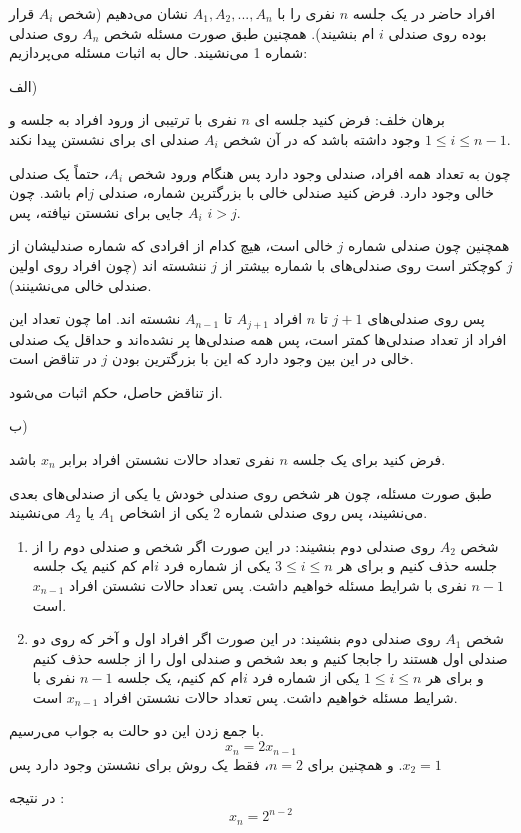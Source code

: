 \p
    افراد حاضر در یک جلسه $n$ نفری را با $A_1, A_2, ... , A_n$ نشان می‌دهیم (شخص $A_i$ قرار بوده روی صندلی $i$ ام بنشیند). همچنین طبق صورت مسئله شخص $A_n$ روی صندلی شماره 1 می‌نشیند. حال به اثبات مسئله می‌پردازیم:
    
    الف) 
    
    برهان خلف: فرض کنید جلسه ای $n$ نفری با ترتیبی از ورود افراد به جلسه و  $1\leq i \leq n-1$ وجود داشته باشد که در آن شخص $A_i$ صندلی ای برای نشستن پیدا نکند. 
    
    چون به تعداد همه افراد، صندلی وجود دارد پس هنگام ورود شخص $A_i$، حتماً یک صندلی خالی وجود دارد. فرض کنید صندلی خالی با بزرگترین شماره، صندلی $j$ام باشد. چون $A_i$ جایی برای نشستن نیافته، پس $i > j$. 
    
    همچنین چون صندلی شماره $j$ خالی است، هیچ کدام از افرادی که شماره صندلیشان از $j$ کوچکتر است روی صندلی‌های با شماره بیشتر از $j$ ننشسته اند (چون افراد روی اولین صندلی خالی می‌نشینند). 
    
    پس روی صندلی‌های $j+1$ تا $n$ افراد $A_{j+1}$ تا $A_{n-1}$ نشسته اند. اما چون تعداد این افراد از تعداد صندلی‌ها کمتر است، پس همه صندلی‌ها پر نشده‌اند و حداقل یک صندلی خالی در این بین وجود دارد که این با بزرگترین بودن $j$ در تناقض است. 
    
    از تناقض حاصل، حکم اثبات می‌شود.
    
    ب)
    
    فرض کنید برای یک جلسه $n$ نفری تعداد حالات نشستن افراد برابر $x_n$ باشد. 
    
    طبق صورت مسئله، چون هر شخص روی صندلی خودش یا یکی از صندلی‌های بعدی می‌نشیند، پس روی صندلی شماره 2 یکی از اشخاص $A_1$ یا $A_2$ می‌نشیند.  
    
    \begin{enumerate}
        \item
        شخص $A_2$ روی صندلی دوم بنشیند: در این صورت اگر شخص و صندلی دوم را از جلسه حذف کنیم و برای هر $3 \leq i \leq n$ یکی از شماره فرد $i$ام کم کنیم یک جلسه $n-1$ نفری با شرایط مسئله خواهیم داشت. پس تعداد حالات نشستن افراد $x_{n-1}$ است.
        \item
        شخص $A_1$ روی صندلی دوم بنشیند: در این صورت اگر افراد اول و آخر که روی دو صندلی اول هستند را جابجا کنیم و بعد شخص و صندلی اول را از جلسه حذف کنیم و برای هر $1 \leq i \leq n$ یکی از شماره فرد $i$ام کم کنیم، یک جلسه $n-1$ نفری با شرایط مسئله خواهیم داشت. پس تعداد حالات نشستن افراد $x_{n-1}$ است.
    \end{enumerate}
    با جمع زدن این دو حالت به جواب می‌رسیم.
    $$x_n = 2x_{n-1}$$
    و همچنین برای $n=2$، فقط یک روش برای نشستن وجود دارد پس $.x_2 =1$
    
    در نتیجه :
    $$x_n=2^{n-2}$$
